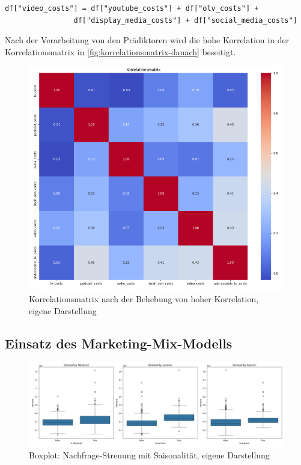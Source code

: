 \begin{lstlisting}
df["video_costs"] = df["youtube_costs"] + df["olv_costs"] + 
                df["display_media_costs"] + df["social_media_costs"]
\end{lstlisting}
Nach der Verarbeitung von den Prädiktoren wird die hohe Korrelation in der Korrelationsmatrix in \autoref{fig:korrelationsmatrix-danach} beseitigt.
\begin{figure}
    \centering
    \includegraphics[width=1\linewidth]{images/korrelationafter.png}
    \caption{Korrelationsmatrix nach der Behebung von hoher Korrelation, eigene Darstellung}
    \label{fig:korrelationsmatrix-danach}
\end{figure}
\subsection{Einsatz des Marketing-Mix-Modells}
\begin{figure}
    \centering
    \includegraphics[width=1\linewidth]{images/boxplot.png}
    \caption{Boxplot: Nachfrage-Streuung mit Saisonalität, eigene Darstellung}
    \label{fig:boxplotsaison}
\end{figure}
